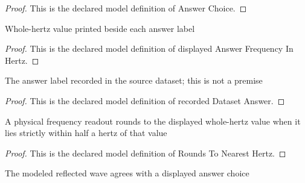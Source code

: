 \begin{proof}
  This is the declared model definition of Answer Choice.
\end{proof}
\begin{definition}
  \label{def:physics:phyx-mini-0214:phyxminiproblems-problemphyxmini0214-displayedanswerfrequencyinhertz}
  Whole-hertz value printed beside each answer label
\end{definition}
\begin{proof}
  This is the declared model definition of displayed Answer Frequency In Hertz.
\end{proof}
\begin{definition}
  \label{def:physics:phyx-mini-0214:phyxminiproblems-problemphyxmini0214-recordeddatasetanswer}
  The answer label recorded in the source dataset; this is not a premise
\end{definition}
\begin{proof}
  This is the declared model definition of recorded Dataset Answer.
\end{proof}
\begin{definition}
  \label{def:physics:phyx-mini-0214:phyxminiproblems-problemphyxmini0214-roundstonearesthertz}
  A physical frequency readout rounds to the displayed whole-hertz value when it lies strictly within half a hertz of that value
\end{definition}
\begin{proof}
  This is the declared model definition of Rounds To Nearest Hertz.
\end{proof}
\begin{definition}
  \label{def:physics:phyx-mini-0214:phyxminiproblems-problemphyxmini0214-matchesanswerchoice}
  The modeled reflected wave agrees with a displayed answer choice
\end{definition}
